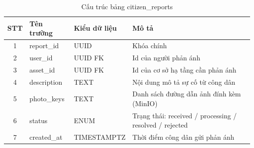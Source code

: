 \renewcommand{\arraystretch}{1.3}
\begin{longtable}{|c|p{3.5cm}|p{4cm}|p{6cm}|}
    \caption{Cấu trúc bảng citizen\_reports}
    \label{tab:db_citizen_reports} \\

    \hline
    \textbf{STT} & \textbf{Tên trường} & \textbf{Kiểu dữ liệu} & \textbf{Mô tả} \\ \hline
    \endfirsthead

    \hline
    \endhead
    \hline
    \endfoot
    \hline
    \endlastfoot

    1 & report\_id & UUID & Khóa chính \\ \hline
    2 & user\_id & UUID FK & Id của người phản ánh \\ \hline
    3 & asset\_id & UUID FK & Id của cơ sở hạ tầng cần phản ánh \\ \hline
    4 & description & TEXT & Nội dung mô tả sự cố từ công dân \\ \hline
    5 & photo\_keys & TEXT & Danh sách đường dẫn ảnh đính kèm (MinIO) \\ \hline
    6 & status & ENUM & Trạng thái: received / processing / resolved / rejected \\ \hline
    7 & created\_at & TIMESTAMPTZ & Thời điểm công dân gửi phản ánh \\
\end{longtable}